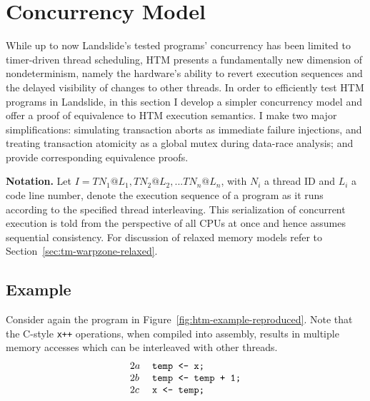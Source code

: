 
\section{Concurrency Model}
\label{sec:tm-design}

While up to now Landslide's tested programs' concurrency has been limited to timer-driven thread scheduling,
HTM presents a fundamentally new dimension of nondeterminism,
namely the hardware's ability to revert execution sequences
and the delayed visibility of changes to other threads.
In order to efficiently test HTM programs in Landslide,
in this section
I develop a simpler concurrency model and offer a proof of equivalence to HTM execution semantics.
I make two major simplifications:
simulating transaction aborts as immediate failure injections,
and treating transaction atomicity as a global mutex during data-race analysis;
and provide corresponding equivalence proofs.

{\bf Notation.} Let $I = TN_1@L_1, TN_2@L_2, ... TN_n@L_n$,
with $N_i$ a thread ID and $L_i$ a code line number,
denote the execution sequence of a program as it runs according to the specified thread interleaving.
This serialization of concurrent execution is told from the perspective of all CPUs at once
and hence assumes sequential consistency.
For discussion of relaxed memory models refer to Section~\ref{sec:tm-warpzone-relaxed}.

\subsection{Example}

Consider again the program in Figure~\ref{fig:htm-example-reproduced}.
Note that the C-style {\tt x++} operations, when compiled into assembly, %
results in multiple memory accesses which can be interleaved with other threads.
\[
\begin{tabular}{ll}
	$2a$ & \texttt{temp <- x;} \\
	$2b$ & \texttt{temp <- temp + 1;} \\
	$2c$ & \texttt{x <- temp;} \\
\end{tabular}
\]

\newcommand\ti{\ensuremath{\hilight{lavender}{\mathbf{T1}}}\xspace}
\newcommand\tj{\ensuremath{\hilight{seafoam}{\mathbf{T2}}}\xspace}
\newcommand\tk{\ensuremath{\hilight{salmon}{\mathbf{T3}}}\xspace}

